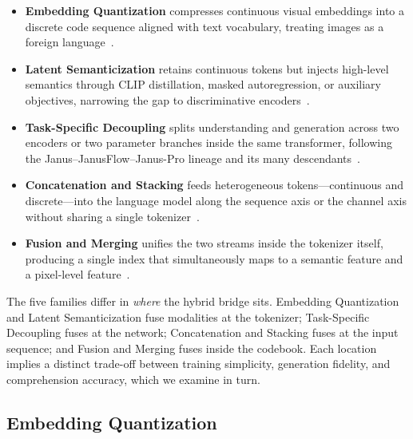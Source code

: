 \begin{itemize}
    \item \textbf{Embedding Quantization} compresses continuous visual embeddings into a discrete code sequence aligned with text vocabulary, treating images as a foreign language~\cite{Ge202308041,Ge202308041,jin2024lavit,DBLP:conf/icml/Jin00XCJHSLZ0GM24,DBLP:conf/acl/ZhanDYZZLZYZL0F24,Ge202414396}.
    \item \textbf{Latent Semanticization} retains continuous tokens but injects high-level semantics through CLIP distillation, masked autoregression, or auxiliary objectives, narrowing the gap to discriminative encoders~\cite{DBLP:conf/cvpr/YangYZRZ0Z25,Lin202505422,Xie202515564,Huang202506590}.
    \item \textbf{Task-Specific Decoupling} splits understanding and generation across two encoders or two parameter branches inside the same transformer, following the Janus--JanusFlow--Janus-Pro lineage and its many descendants~\cite{DBLP:conf/cvpr/WuCWMLPLXYR025,DBLP:conf/cvpr/MaLCLWWPXZYZW0R25,Shi202415188,Chen202517811,Zhuang202512327,Fan202513436,Zhuang202512327,Tian202514682,Liao202505472,Deng202514683,Wu202518871,Wang202523044,Xu202510395,Lin202505422,Wang202523044,Wei202504548,Wang202523044,Tian202514682}.
    \item \textbf{Concatenation and Stacking} feeds heterogeneous tokens---continuous and discrete---into the language model along the sequence axis or the channel axis without sharing a single tokenizer~\cite{Huang202506590,Jiao202504423,He202504810}.
    \item \textbf{Fusion and Merging} unifies the two streams inside the tokenizer itself, producing a single index that simultaneously maps to a semantic feature and a pixel-level feature~\cite{DBLP:conf/iccv/XieDSL25,DBLP:conf/cvpr/QuZLWJGYDYW25,Chen202517811}.
\end{itemize}

The five families differ in \emph{where} the hybrid bridge sits. Embedding Quantization and Latent Semanticization fuse modalities at the tokenizer; Task-Specific Decoupling fuses at the network; Concatenation and Stacking fuses at the input sequence; and Fusion and Merging fuses inside the codebook. Each location implies a distinct trade-off between training simplicity, generation fidelity, and comprehension accuracy, which we examine in turn.

\subsection{Embedding Quantization}
\label{subsec:embed-quant}

